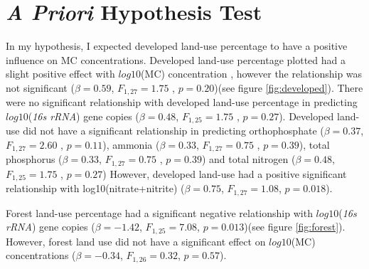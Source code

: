 


\section{\emph{A Priori} Hypothesis Test}

In my hypothesis, I expected developed land-use percentage to have a positive influence on MC concentrations. Developed land-use percentage plotted had a slight positive effect with $log10$(MC) concentration , however the relationship was not significant  ($\beta=0.59$, $F_{{1,27}}=1.75$ , $p=0.20$)(see figure \ref{fig:developed}). There were no significant relationship with developed land-use percentage in predicting $log10$(\emph{16s rRNA}) gene copies ($\beta=0.48$, $F_{{1,25}}=1.75$ , $p=0.27$). Developed land-use did not have a significant relationship in predicting orthophosphate ($\beta=0.37$, $F_{{1,27}}=2.60$ , $p=0.11$), ammonia ($\beta=0.33$, $F_{{1,27}}=0.75$ , $p=0.39$), total phosphorus  ($\beta=0.33$, $F_{{1,27}}=0.75$ , $p=0.39$) and total nitrogen ($\beta=0.48$, $F_{{1,25}}=1.75$ , $p=0.27$) However, developed land-use had a positive significant relationship with log10(nitrate+nitrite) ($\beta=0.75$, $F_{{1,27}}=1.08$, $p=0.018$). 

Forest land-use percentage had a significant negative relationship with $log10$(\emph{16s rRNA}) gene copies ($\beta=-1.42$, $F_{{1,25}}=7.08$, $p=0.013$)(see figure \ref{fig:forest}). However, forest land use did not have a significant effect on $log10$(MC) concentrations ($\beta=-0.34$, $F_{{1,26}}=0.32$, $p=0.57$).

